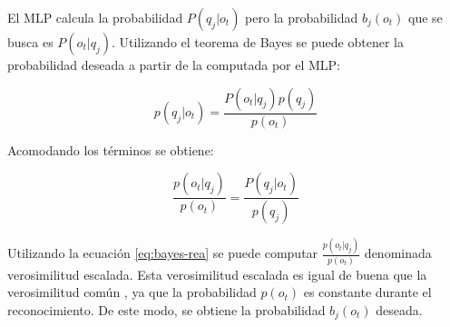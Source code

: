 El MLP calcula la probabilidad $P(q_j|o_t)$ pero la probabilidad $b_j(o_t)$ que se busca es $P(o_t|q_j)$. Utilizando el teorema de
Bayes se puede obtener la probabilidad deseada a partir de la computada por el MLP:

\begin{equation}
    p(q_j|o_t) = \frac{P(o_t|q_j)p(q_j)}{p(o_t)}
\end{equation}

Acomodando los t\'erminos se obtiene:

\begin{equation}
    \frac{p(o_t|q_j)}{p(o_t)} = \frac{P(q_j|o_t)}{p(q_j)}
\label{eq:bayes-rea}
\end{equation}

Utilizando la ecuaci\'on \eqref{eq:bayes-rea} se puede computar $\frac{p(o_t|q_j)}{p(o_t)}$ denominada verosimilitud escalada. Esta
verosimilitud escalada es igual de buena que la verosimilitud com\'un \cite{Jurafsky}, ya que la probabilidad $p(o_t)$ es constante
durante el reconocimiento. De este modo, se obtiene la probabilidad $b_j(o_t)$ deseada.

